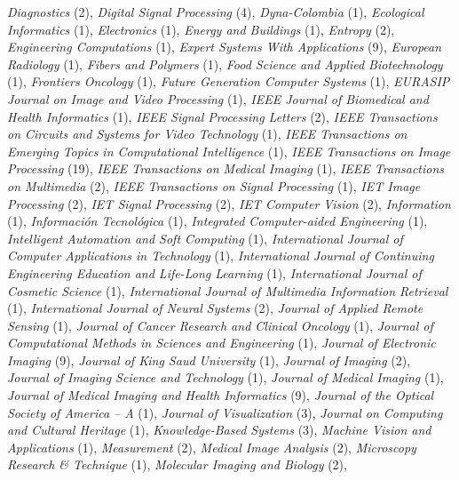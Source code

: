 \documentclass[11pt]{article}
\begin{document}
\begin{itemize}
    \emph{Diagnostics} (2),
    \emph{Digital Signal Processing} (4),
    \emph{Dyna-Colombia} (1),
    \emph{Ecological Informatics} (1),
    \emph{Electronics} (1),
    \emph{Energy and Buildings} (1),
    \emph{Entropy} (2),
    \emph{Engineering Computations} (1),
    \emph{Expert Systems With Applications} (9),
    \emph{European Radiology} (1),
    \emph{Fibers and Polymers} (1),
    \emph{Food Science and Applied Biotechnology} (1),
    \emph{Frontiers Oncology} (1),
    \emph{Future Generation Computer Systems} (1),
    \emph{EURASIP Journal on Image and Video Processing} (1),
    \emph{IEEE Journal of Biomedical and Health Informatics} (1),
    \emph{IEEE Signal Processing Letters} (2),
    \emph{IEEE Transactions on Circuits and Systems for Video Technology} (1),
    \emph{IEEE Transactions on Emerging Topics in Computational Intelligence} (1),
    \emph{IEEE Transactions on Image Processing} (19),
    \emph{IEEE Transactions on Medical Imaging} (1),
    \emph{IEEE Transactions on Multimedia} (2),
    \emph{IEEE Transactions on Signal Processing} (1),
    \emph{IET Image Processing} (2),
    \emph{IET Signal Processing} (2),
    \emph{IET Computer Vision} (2),
    \emph{Information} (1),
    \emph{Información Tecnológica} (1),
    \emph{Integrated Computer-aided Engineering} (1),
    \emph{Intelligent Automation and Soft Computing} (1),
    \emph{International Journal of Computer Applications in Technology} (1),
    \emph{International  Journal  of Continuing  Engineering  Education and  Life-Long Learning} (1),
    \emph{International Journal of Cosmetic Science} (1),
    \emph{International Journal of Multimedia Information Retrieval} (1),
    \emph{International Journal of Neural Systems} (2),
    \emph{Journal of Applied Remote Sensing} (1),
    \emph{Journal of Cancer Research and Clinical Oncology} (1),
    \emph{Journal of Computational Methods in Sciences and Engineering} (1),
    \emph{Journal of Electronic Imaging} (9),
		\emph{Journal of King Saud University} (1),
    \emph{Journal of Imaging} (2),
    \emph{Journal of Imaging Science and Technology} (1),
    \emph{Journal of Medical Imaging} (1),
    \emph{Journal of Medical Imaging and Health Informatics} (9),
    \emph{Journal of the Optical Society of America – A} (1),
    \emph{Journal of Visualization} (3),
    \emph{Journal on Computing and Cultural Heritage} (1),
    \emph{Knowledge-Based Systems} (3),
    \emph{Machine Vision and Applications} (1),
    \emph{Measurement} (2),
		\emph{Medical Image Analysis} (2),
    \emph{Microscopy Research \& Technique} (1),
    \emph{Molecular Imaging and Biology} (2),

\end{itemize}
\end{document}
